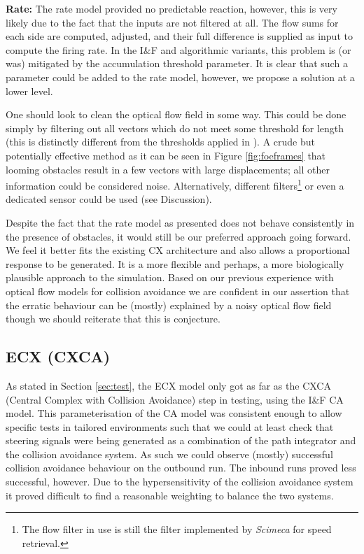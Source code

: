 \documentclass[a4paper,11pt,twoside,openright]{article}
\begin{document}
\textbf{Rate:} The rate model provided no predictable reaction,
however, this is very likely due to the fact that the inputs are not
filtered at all. The flow sums for each side are computed, adjusted,
and their full difference is supplied as input to compute the firing
rate. In the I\&F and algorithmic variants, this problem is (or was)
mitigated by the accumulation threshold parameter. It is clear that
such a parameter could be added to the rate model, however, we propose
a solution at a lower level.\newline\par

One should look to clean the optical flow field in some way. This
could be done simply by filtering out all vectors which do not meet
some threshold for length (this is distinctly different from the
thresholds applied in \cite{Mitchell2018}). A crude but potentially
effective method as it can be seen in Figure \ref{fig:foeframes} that
looming obstacles result in a few vectors with large displacements;
all other information could be considered noise. Alternatively,
different filters\footnote{The flow filter in use is still the filter
  implemented by \textit{Scimeca} for speed
  retrieval\cite{Scimeca2017,Mitchell2018}. } or even a dedicated
sensor could be used (see Discussion).\newline\par

Despite the fact that the rate model as presented does not behave
consistently in the presence of obstacles, it would still be our
preferred approach going forward. We feel it better fits the existing
CX architecture and also allows a proportional response to be
generated. It is a more flexible and perhaps, a more biologically
plausible approach to the simulation. Based on our previous experience
with optical flow models for collision avoidance we are confident in
our assertion that the erratic behaviour can be (mostly) explained by
a noisy optical flow field though we should reiterate that this is
conjecture.

\subsection{ECX (CXCA)}
As stated in Section \ref{sec:test}, the ECX model only got as far as
the CXCA (Central Complex with Collision Avoidance) step in testing,
using the I\&F CA model. This parameterisation of the CA model was
consistent enough to allow specific tests in tailored environments
such that we could at least check that steering signals were being
generated as a combination of the path integrator and the collision
avoidance system. As such we could observe (mostly) successful
collision avoidance behaviour on the outbound run. The inbound runs
proved less successful, however. Due to the hypersensitivity of the
collision avoidance system it proved difficult to find a reasonable
weighting to balance the two systems.
\newline\par
\end{document}
